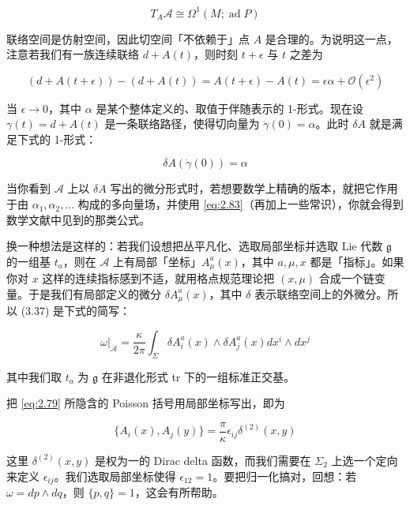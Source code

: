 \begin{equation}
  T_A\mathcal{A}\cong\Omega^{1}(M;\operatorname{ad}P)
  \tag{2.81}
  \label{eq:2.81}
\end{equation}

联络空间是仿射空间，因此切空间「不依赖于」点 $A$ 是合理的。为说明这一点，注意若我们有一族连续联络 $d+A(t)$，则时刻 $t+\epsilon$ 与 $t$ 之差为

\begin{equation}
  (d+A(t+\epsilon))-(d+A(t))=A(t+\epsilon)-A(t)=\epsilon\alpha+\mathcal{O}(\epsilon^{2})
  \tag{2.82}
  \label{eq:2.82}
\end{equation}

当 $\epsilon\to0$，其中 $\alpha$ 是某个整体定义的、取值于伴随表示的 1-形式。现在设 $\gamma(t)=d+A(t)$ 是一条联络路径，使得切向量为 $\dot\gamma(0)=\alpha$。此时 $\delta A$ 就是满足下式的 1-形式：

\begin{equation}
  \delta A(\dot\gamma(0))=\alpha
  \tag{2.83}
  \label{eq:2.83}
\end{equation}

当你看到 $\mathcal{A}$ 上以 $\delta A$ 写出的微分形式时，若想要数学上精确的版本，就把它作用于由 $\alpha_1,\alpha_2,\dots$ 构成的多向量场，并使用 \eqref{eq:2.83}（再加上一些常识），你就会得到数学文献中见到的那类公式。

换一种想法是这样的：若我们设想把丛平凡化、选取局部坐标并选取 Lie 代数 $\mathfrak{g}$ 的一组基 $t_a$，则在 $\mathcal{A}$ 上有局部「坐标」$A^{a}_{\mu}(x)$，其中 $a,\mu,x$ 都是「指标」。如果你对 $x$ 这样的连续指标感到不适，就用格点规范理论把 $(x,\mu)$ 合成一个链变量。于是我们有局部定义的微分 $\delta A^{a}_{\mu}(x)$，其中 $\delta$ 表示联络空间上的外微分。所以 (3.37) 是下式的简写：

\begin{equation}
  \omega|_{\mathcal{A}}=\frac{\kappa}{2\pi}\int_{\Sigma}\delta A^{a}_{i}(x)\wedge\delta A^{a}_{j}(x)dx^{i}\wedge dx^{j}
  \tag{2.84}
  \label{eq:2.84}
\end{equation}

其中我们取 $t_a$ 为 $\mathfrak{g}$ 在非退化形式 tr 下的一组标准正交基。

把 \eqref{eq:2.79} 所隐含的 Poisson 括号用局部坐标写出，即为

\begin{equation}
  \{A_i(x),A_j(y)\}=\frac{\pi}{\kappa}\epsilon_{ij}\delta^{(2)}(x,y)
  \tag{2.85}
  \label{eq:2.85}
\end{equation}

这里 $\delta^{(2)}(x,y)$ 是权为一的 Dirac delta 函数，而我们需要在 $\Sigma_2$ 上选一个定向来定义 $\epsilon_{ij}$。我们选取局部坐标使得 $\epsilon_{12}=1$。要把归一化搞对，回想：若 $\omega=dp\wedge dq$，则 $\{p,q\}=1$，这会有所帮助。

